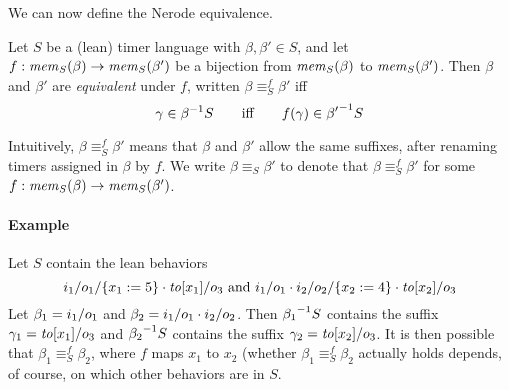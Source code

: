 We can now define the Nerode equivalence.

\begin{definition}
  \label{def:bj-nerode}
Let $S$ be a (lean) timer language with $\beta,\beta'\in S$,
and let $f : \getmemorable{S}{\beta} \to \getmemorable{S}{\beta'}$
be a bijection
from $\getmemorable{S}{\beta}$ to $\getmemorable{S}{\beta'}$.
Then $\beta$ and $\beta'$ are \emph{equivalent} under $f$, written
$\beta \equiv_{S}^f \beta'$ iff
\[
\gamma \in \suffixbehs{S}{\beta}
\qquad \mbox{iff} \qquad
f(\gamma) \in \suffixbehs{S}{\beta'}
\]
\end{definition}
Intuitively, $\beta \equiv_{S}^f \beta'$ means that $\beta$ and $\beta'$
allow the same suffixes, after renaming
timers assigned in $\beta$ by $f$.
We write $\beta \equiv_{S} \beta'$ to denote that
$\beta \equiv_{S}^f \beta'$ for some
$f : \getmemorable{S}{\beta} \to \getmemorable{S}{\beta'}$.

\paragraph{Example} Let $S$ contain the lean behaviors
\[
\utlabel{i_1}{o_1}{\set{x_1:=5}} \cdot \simpleutlabel{\toevent{x_1}}{o_3}
\mbox{ and }
\simpleutlabel{i_1}{o_1} \cdot \utlabel{i_2}{o_2}{\set{x_2:=4}} \cdot \simpleutlabel{\toevent{x_2}}{o_3}
\]
Let $\beta_1 = \simpleutlabel{i_1}{o_1}$ and
$\beta_2 = \simpleutlabel{i_1}{o_1} \cdot \simpleutlabel{i_2}{o_2}$.
Then $\suffixbehs{S}{\beta_1}$ contains the suffix
$\gamma_1 = \simpleutlabel{\toevent{x_1}}{o_3}$ and
$\suffixbehs{S}{\beta_2}$ contains the suffix
$\gamma_2 = \simpleutlabel{\toevent{x_2}}{o_3}$.
It is then possible that
$\beta_1 \equiv_S^f \beta_2$, where $f$ maps $x_1$ to $x_2$ (whether
$\beta_1 \equiv_S^f \beta_2$ actually holds depends, of course, on which other
behaviors are in $S$.



